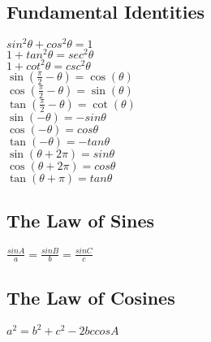 \documentclass{article}
\begin{document}
	\subsection*{Fundamental Identities}
		\begin{center}
		$sin^2 \theta + cos^2 \theta = 1$\\
		\vspace{10pt}
		$1 + tan^2 \theta = sec^2\theta$\\
		\vspace{10pt}
		$1 + cot^2 \theta = csc^2 \theta$\\
		\vspace{10pt}
		$\sin(\frac{\pi}{2} - \theta) = \cos(\theta)$\\
		\vspace{10pt}
		$\cos(\frac{\pi}{2} - \theta) = \sin(\theta)$\\
		\vspace{10pt}
		$\tan(\frac{\pi}{2} - \theta) = \cot(\theta)$\\
		\vspace{10pt}
		$\sin(-\theta) = -sin\theta$\\
		\vspace{10pt}
		$\cos(-\theta) = cos\theta$\\
		\vspace{10pt}
		$\tan(-\theta) = -tan\theta$\\
		\vspace{10pt}
		$\sin(\theta + 2\pi) = sin\theta$\\
		\vspace{10pt}
		$\cos(\theta + 2\pi) = cos\theta$\\
		\vspace{10pt}
		$\tan(\theta + \pi) = tan\theta$
		\end{center}
	\subsection*{The Law of Sines}
		\begin{center}
		$\frac{sin A}{a} = \frac{sin B}{b} = \frac{sin C}{c}$
		\end{center}
	\subsection*{The Law of Cosines}
		\begin{center}
		$a^2 = b^2 + c^2 - 2bc cos A$
		\end{center}
\end{document}
